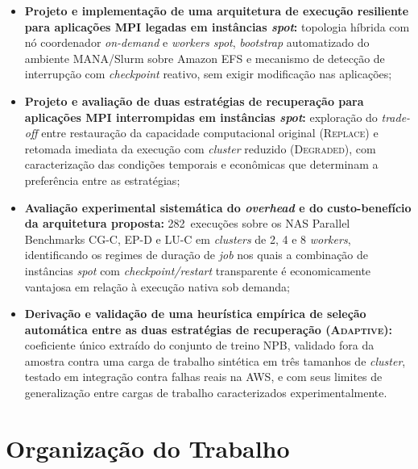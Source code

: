 \begin{itemize}
  \item \textbf{Projeto e implementação de uma arquitetura de execução resiliente para
        aplicações MPI legadas em instâncias \textit{spot}:} topologia híbrida com nó
        coordenador \textit{on-demand} e \textit{workers spot}, \textit{bootstrap}
        automatizado do ambiente MANA/Slurm sobre Amazon EFS e mecanismo de detecção
        de interrupção com \textit{checkpoint} reativo, sem exigir modificação nas
        aplicações;

  \item \textbf{Projeto e avaliação de duas estratégias de recuperação para
        aplicações MPI interrompidas em instâncias \textit{spot}:} exploração do
        \textit{trade-off} entre restauração da capacidade computacional original
        (\textsc{Replace}) e retomada imediata da execução com \textit{cluster} reduzido
        (\textsc{Degraded}), com caracterização das condições temporais e econômicas que
        determinam a preferência entre as estratégias;

  \item \textbf{Avaliação experimental sistemática do \textit{overhead} e do
        custo-benefício da arquitetura proposta:} 282~execuções sobre os NAS Parallel
        Benchmarks CG-C, EP-D e LU-C em \textit{clusters} de 2, 4 e 8
        \textit{workers}, identificando os regimes de duração de \textit{job} nos quais
        a combinação de instâncias \textit{spot} com \textit{checkpoint/restart}
        transparente é economicamente vantajosa em relação à execução nativa sob
        demanda;

  \item \textbf{Derivação e validação de uma heurística empírica de seleção
        automática entre as duas estratégias de recuperação
        (\textsc{Adaptive}):} coeficiente único extraído do conjunto de treino NPB,
        validado fora da amostra contra uma carga de trabalho sintética em três
        tamanhos de \textit{cluster}, testado em integração contra falhas reais na
        AWS, e com seus limites de generalização entre cargas de trabalho
        caracterizados experimentalmente.
\end{itemize}


\section{Organização do Trabalho}
\label{sec:organizacao}

